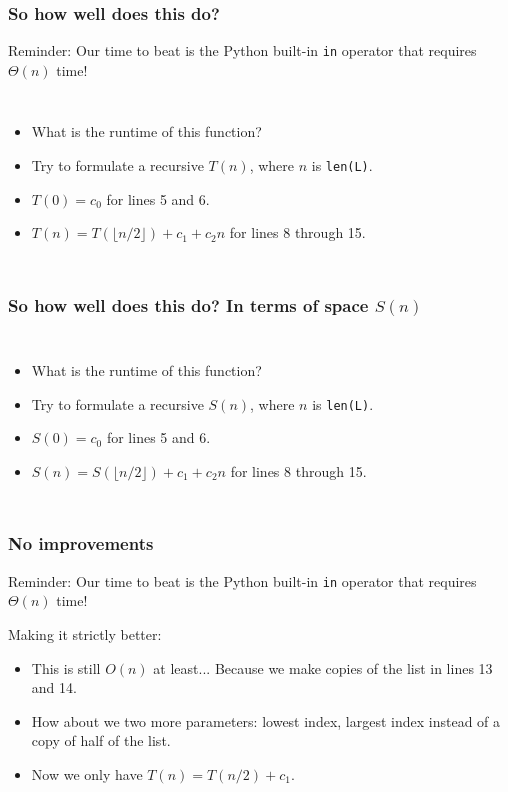 \begin{frame}
	\frametitle{So how well does this do?}

Reminder: 			Our time to beat is the Python built-in \texttt{in} operator that requires $\Theta(n)$ time!

		\begin{columns}
					
			
				\begin{itemize}
					\item What is the runtime of this function? 
					\item Try to formulate a recursive $T(n)$, where $n$ is \texttt{len(L)}.
					\item $T(0) = c_0$ for lines 5 and 6.
					\item $T(n) = T(\lfloor n/2 \rfloor) + c_1 + c_2n$ for lines 8 through 15.
			\end{itemize}
		\end{columns}
\end{frame}

\begin{frame}
	\frametitle{So how well does this do? In terms of space $S(n)$}

		\begin{columns}
			\column{0.605\textwidth}
				
			\column{0.405\textwidth}
				\begin{itemize}
					\item What is the runtime of this function? 
					\item Try to formulate a recursive $S(n)$, where $n$ is \texttt{len(L)}.
					\item $S(0) = c_0$ for lines 5 and 6.\\
					\item $S(n) = S(\lfloor n/2 \rfloor) + c_1 + c_2n$ for lines 8 through 15.
			\end{itemize}
		\end{columns}
\end{frame}

\begin{frame}
	\frametitle{No improvements}
Reminder:
			Our time to beat is the Python built-in \texttt{in} operator that requires $\Theta(n)$ time!

Making it strictly better:
				\begin{itemize}
					\item This is still $O(n)$ at least... Because we make copies of the list in lines 13 and 14.
					\item How about we two more parameters: lowest index, largest index instead of a copy of half of the list.
					\item Now we only have $T(n) = T(n/2) + c_1$.
		\end{itemize}	
\end{frame}

